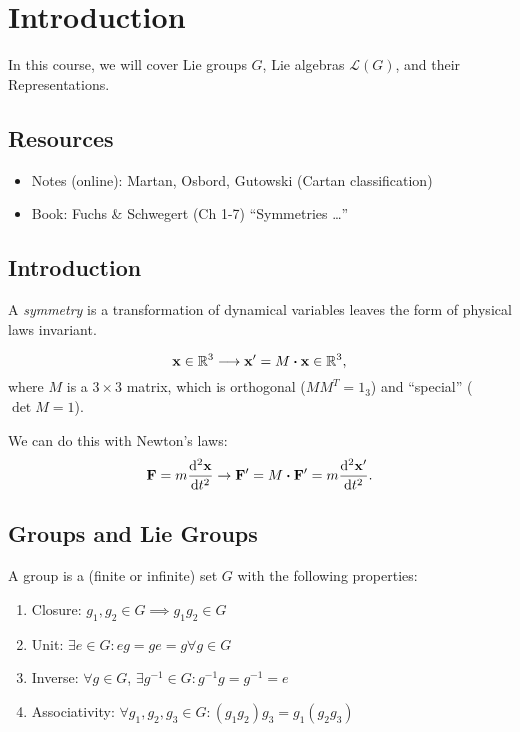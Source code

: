 \chapter{Introduction}%
\label{cha:introduction}

In this course, we will cover Lie groups $G$, Lie algebras $\mathscr{L}(G)$, and their Representations.

\section*{Resources}%
\label{sec:resources}

\begin{itemize}
  \item Notes (online): Martan, Osbord, Gutowski (Cartan classification)
  \item Book: Fuchs \& Schwegert (Ch 1-7) ``Symmetries \dots''
\end{itemize}

\section{Introduction}%
\label{sec:introduction}

\begin{definition}
A \emph{symmetry} is a transformation of dynamical variables leaves the form of physical laws invariant.
\end{definition}

\begin{example}[Rotation]
  \begin{equation}
    \vb x \in \mathbb{R}^{3} \longrightarrow \vb x' = M \vdot \vb x \in \mathbb{R}^{3},
  \end{equation}
  where $M$ is a $3\times 3$ matrix, which is orthogonal ($M M^T = 1_{3}$) and ``special'' ($\det M = 1$).

  We can do this with Newton's laws:
  \begin{equation}
    \vb F = m \dv[2]{\vb x}{t} \rightarrow \vb F' = M \vdot \vb F' = m \dv[2]{\vb x'}{t}.
  \end{equation}
\end{example}

\section{Groups and Lie Groups}%
\label{sec:groups_and_lie_groups}

\begin{definition}[Group]
 A group is a (finite or infinite) set $G$ with the following properties:
\begin{enumerate}
  \item Closure: $g_1, g_2 \in G \implies g_1 g_2 \in G$
  \item Unit: $\exists e \in G: eg = ge = g \forall g \in G$
  \item Inverse: $\forall g \in G$, $\exists g^{-1} \in G : g^{-1}g = g^{-1} = e$
  \item Associativity: $\forall g_1, g_2, g_3 \in G: (g_1 g_2) g_3 = g_1 (g_2 g_3)$
\end{enumerate}
\end{definition} 

